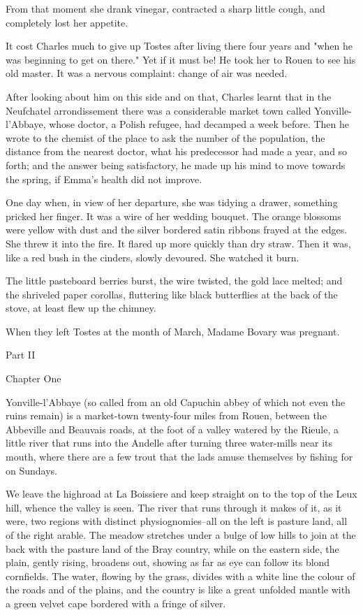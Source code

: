 \documentclass[11pt,twocolumn]{ltugboat}
\begin{document}
From that moment she drank vinegar, contracted a sharp little cough, and
completely lost her appetite.

It cost Charles much to give up Tostes after living there four years and
"when he was beginning to get on there." Yet if it must be! He took her
to Rouen to see his old master. It was a nervous complaint: change of
air was needed.

After looking about him on this side and on that, Charles learnt that
in the Neufchatel arrondissement there was a considerable market town
called Yonville-l'Abbaye, whose doctor, a Polish refugee, had decamped a
week before. Then he wrote to the chemist of the place to ask the
number of the population, the distance from the nearest doctor, what
his predecessor had made a year, and so forth; and the answer being
satisfactory, he made up his mind to move towards the spring, if Emma's
health did not improve.

One day when, in view of her departure, she was tidying a drawer,
something pricked her finger. It was a wire of her wedding bouquet.
The orange blossoms were yellow with dust and the silver bordered satin
ribbons frayed at the edges. She threw it into the fire. It flared
up more quickly than dry straw. Then it was, like a red bush in the
cinders, slowly devoured. She watched it burn.

The little pasteboard berries burst, the wire twisted, the gold
lace melted; and the shriveled paper corollas, fluttering like black
butterflies at the back of the stove, at least flew up the chimney.

When they left Tostes at the month of March, Madame Bovary was pregnant.





Part II



Chapter One

Yonville-l'Abbaye (so called from an old Capuchin abbey of which not
even the ruins remain) is a market-town twenty-four miles from Rouen,
between the Abbeville and Beauvais roads, at the foot of a valley
watered by the Rieule, a little river that runs into the Andelle after
turning three water-mills near its mouth, where there are a few trout
that the lads amuse themselves by fishing for on Sundays.

We leave the highroad at La Boissiere and keep straight on to the top of
the Leux hill, whence the valley is seen. The river that runs through it
makes of it, as it were, two regions with distinct physiognomies--all on
the left is pasture land, all of the right arable. The meadow stretches
under a bulge of low hills to join at the back with the pasture land of
the Bray country, while on the eastern side, the plain, gently rising,
broadens out, showing as far as eye can follow its blond cornfields. The
water, flowing by the grass, divides with a white line the colour of the
roads and of the plains, and the country is like a great unfolded mantle
with a green velvet cape bordered with a fringe of silver.
\end{document}
